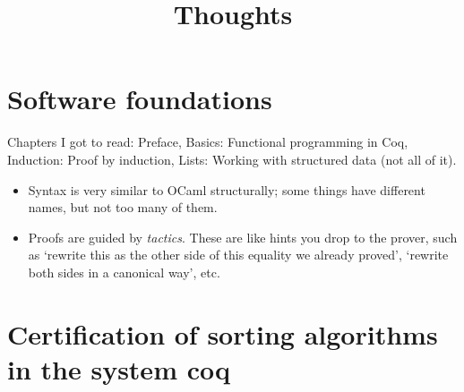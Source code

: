 
\title{Thoughts}
\author{}

\maketitle

\section{Software foundations}
\label{sec:}

Chapters I got to read: Preface, Basics: Functional programming in Coq, Induction: Proof by induction, Lists: Working with structured data (not all of it).

\begin{itemize}
	\item Syntax is very similar to OCaml structurally; some things have different names, but not too many of them. 
	\item Proofs are guided by \emph{tactics}. These are like hints you drop to the prover, such as `rewrite this as the other side of this equality we already proved', `rewrite both sides in a canonical way', etc.
\end{itemize}




\section{Certification of sorting algorithms in the system coq\cite{filliatre1999certification}}
\label{sec:}




